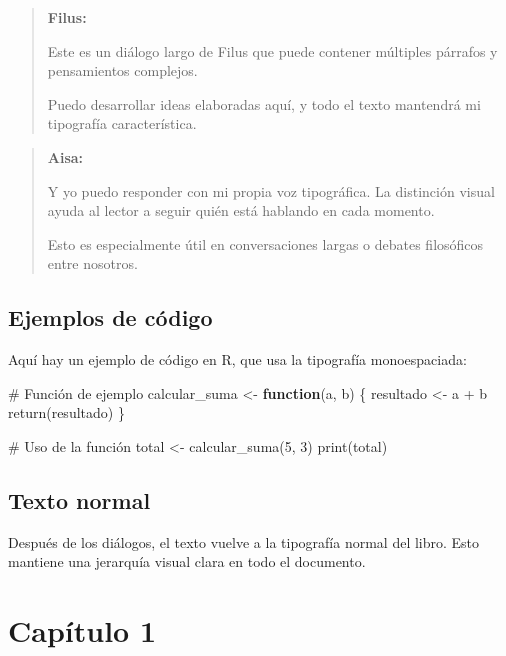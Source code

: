 \documentclass[
  letterpaper,
]{scrbook}
\newenvironment{Shaded}{\begin{snugshade}}{\end{snugshade}}
\newcommand{\CommentTok}[1]{\textcolor[rgb]{0.37,0.37,0.37}{#1}}
\newcommand{\ControlFlowTok}[1]{\textcolor[rgb]{0.00,0.23,0.31}{\textbf{#1}}}
\newcommand{\DecValTok}[1]{\textcolor[rgb]{0.68,0.00,0.00}{#1}}
\newcommand{\FunctionTok}[1]{\textcolor[rgb]{0.28,0.35,0.67}{#1}}
\newcommand{\NormalTok}[1]{\textcolor[rgb]{0.00,0.23,0.31}{#1}}
\newcommand{\OtherTok}[1]{\textcolor[rgb]{0.00,0.23,0.31}{#1}}
\newcommand{\SpecialCharTok}[1]{\textcolor[rgb]{0.37,0.37,0.37}{#1}}
\newenvironment{dialogofilus}{%
  \begin{quote}
  \filusfont
  \noindent\textbf{Filus:}\par
}{%
  \end{quote}
}
\newenvironment{dialogoaisa}{%
  \begin{quote}
  \aisafont
  \noindent\textbf{Aisa:}\par
}{%
  \end{quote}
}
\begin{document}
\begin{dialogofilus}
Este es un diálogo largo de Filus que puede
contener múltiples párrafos y pensamientos complejos.

Puedo desarrollar ideas elaboradas aquí,
y todo el texto mantendrá mi tipografía característica.
\end{dialogofilus}

\begin{dialogoaisa}
Y yo puedo responder con mi propia voz tipográfica.
La distinción visual ayuda al lector a seguir
quién está hablando en cada momento.

Esto es especialmente útil en conversaciones largas
o debates filosóficos entre nosotros.
\end{dialogoaisa}

\section{Ejemplos de código}\label{ejemplos-de-cuxf3digo}

Aquí hay un ejemplo de código en R, que usa la tipografía monoespaciada:

\begin{Shaded}
\begin{Highlighting}[]
\CommentTok{\# Función de ejemplo}
\NormalTok{calcular\_suma }\OtherTok{\textless{}{-}} \ControlFlowTok{function}\NormalTok{(a, b) \{}
\NormalTok{  resultado }\OtherTok{\textless{}{-}}\NormalTok{ a }\SpecialCharTok{+}\NormalTok{ b}
  \FunctionTok{return}\NormalTok{(resultado)}
\NormalTok{\}}

\CommentTok{\# Uso de la función}
\NormalTok{total }\OtherTok{\textless{}{-}} \FunctionTok{calcular\_suma}\NormalTok{(}\DecValTok{5}\NormalTok{, }\DecValTok{3}\NormalTok{)}
\FunctionTok{print}\NormalTok{(total)}
\end{Highlighting}
\end{Shaded}

\section{Texto normal}\label{texto-normal}

Después de los diálogos, el texto vuelve a la tipografía normal del
libro. Esto mantiene una jerarquía visual clara en todo el documento.


\chapter{Capítulo 1}\label{capuxedtulo-1}
\end{document}
